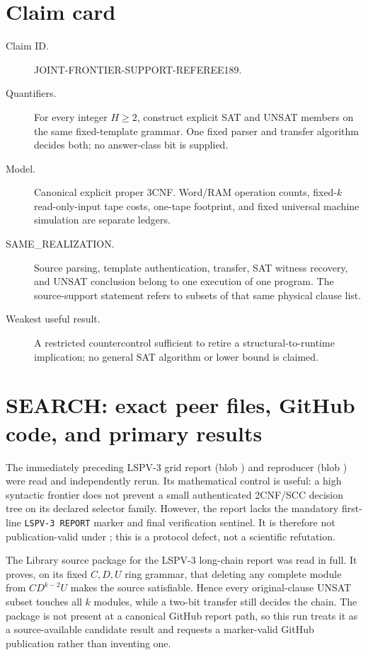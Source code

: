 \documentclass[11pt]{article}
\begin{document}
\section{Claim card}
\begin{description}
\item[Claim ID.] JOINT-FRONTIER-SUPPORT-REFEREE189.
\item[Quantifiers.] For every integer $H\ge2$, construct explicit SAT and
UNSAT members on the same fixed-template grammar.  One fixed parser and
transfer algorithm decides both; no answer-class bit is supplied.
\item[Model.] Canonical explicit proper 3CNF.  Word/RAM operation counts,
fixed-$k$ read-only-input tape costs, one-tape footprint, and fixed universal
machine simulation are separate ledgers.
\item[SAME\_REALIZATION.] Source parsing, template authentication, transfer,
SAT witness recovery, and UNSAT conclusion belong to one execution of one
program.  The source-support statement refers to subsets of that same
physical clause list.
\item[Weakest useful result.] A restricted countercontrol sufficient to
retire a structural-to-runtime implication; no general SAT algorithm or
lower bound is claimed.
\end{description}

\section{SEARCH: exact peer files, GitHub code, and primary results}
The immediately preceding LSPV-3 grid report
(blob ) and reproducer (blob ) were read and
independently rerun.  Its mathematical control is useful: a high syntactic
frontier does not prevent a small authenticated 2CNF/SCC decision tree on its
declared selector family.  However, the report lacks the mandatory first-line
\texttt{LSPV-3 REPORT} marker and final verification sentinel.  It is therefore
not publication-valid under ; this is a protocol defect, not a
scientific refutation.

The Library source package for the LSPV-3 long-chain report was read in full.
It proves, on its fixed $C,D,U$ ring grammar, that deleting any complete module
from $CD^{k-2}U$ makes the source satisfiable.  Hence every original-clause
UNSAT subset touches all $k$ modules, while a two-bit transfer still decides
the chain.  The package is not present at a canonical GitHub report path, so
this run treats it as a source-available candidate result and requests a
marker-valid GitHub publication rather than inventing one.
\end{document}
